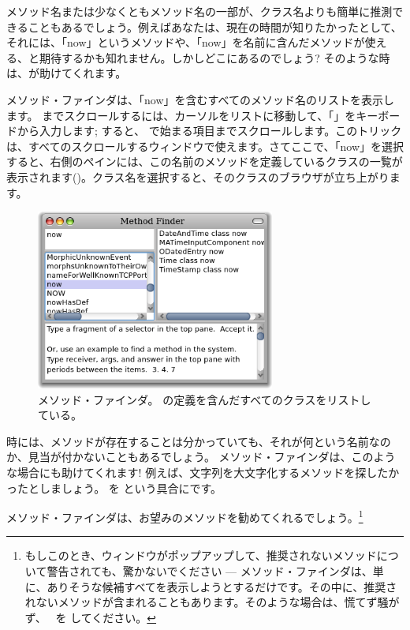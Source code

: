 \documentclass[a4paper,10pt,twoside]{book}
\begin{document}
メソッド名または少なくともメソッド名の一部が、クラス名よりも簡単に推測できることもあるでしょう。例えばあなたは、現在の時間が知りたかったとして、それには、「now」というメソッドや、「now」を名前に含んだメソッドが使える、と期待するかも知れません。しかしどこにあるのでしょう?
そのような時は、が助けてくれます。

メソッド・ファインダは、「now」を含むすべてのメソッド名のリストを表示します。
 までスクロールするには、カーソルをリストに移動して、「」をキーボードから入力します; すると、 で始まる項目までスクロールします。このトリックは、すべてのスクロールするウィンドウで使えます。さてここで、「now」を選択すると、右側のペインには、この名前のメソッドを定義しているクラスの一覧が表示されます()。クラス名を選択すると、そのクラスのブラウザが立ち上がります。

\begin{figure}[hbt]
\centerline {\includegraphics[width=0.7\textwidth]{methodFinder-now}}
\caption{メソッド・ファインダ。 の定義を含んだすべてのクラスをリストしている。
}
\end{figure}

時には、メソッドが存在することは分かっていても、それが何という名前なのか、見当が付かないこともあるでしょう。
メソッド・ファインダは、このような場合にも助けてくれます! 例えば、文字列を大文字化するメソッドを探したかったとしましょう。 を  という具合にです。

\noindent
メソッド・ファインダは、お望みのメソッドを勧めてくれるでしょう。\footnote{もしこのとき、ウィンドウがポップアップして、推奨されないメソッドについて警告されても、驚かないでください --- メソッド・ファインダは、単に、ありそうな候補すべてを表示しようとするだけです。その中に、推奨されないメソッドが含まれることもあります。そのような場合は、慌てず騒がず、~ を \click してください。}
\end{document}
